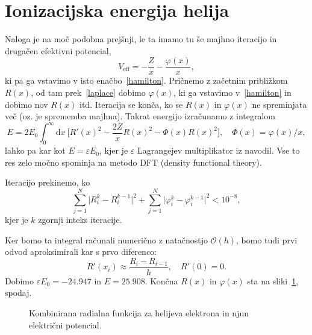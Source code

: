 \documentclass[a4 paper, 12pt]{article}
\renewcommand{\d}{
	\ensuremath{\mathrm{d}}
}
\begin{document}
\section{Ionizacijska energija helija}

Naloga je na mo\v c podobna prej\v snji, le ta imamo tu \v se majhno iteracijo in druga\v cen efektivni potencial,
\[
	V_\text{eff} = -\frac{Z}{x} -\frac{\varphi(x)}{x},
\]
ki pa ga vstavimo v isto ena\v cbo~\eqref{hamilton}. Pri\v cnemo z za\v cetnim pribli\v zkom $R(x)$, od tam
prek~\eqref{laplace} dobimo $\varphi(x)$, ki ga vstavimo v~\eqref{hamilton} in dobimo nov $R(x)$ itd. Iteracija
se kon\v ca, ko se $R(x)$ in $\varphi(x)$ ne spreminjata ve\v c (oz. je sprememba majhna). Takrat energijo
izra\v cunamo z integralom
\[
	E = 2E_0 \int_0^\infty \d x\ \bigg[R'(x)^2 - \frac{2Z}{x}R(x)^2 - \Phi(x)R(x)^2\bigg],\quad
		\Phi(x) = \varphi(x)/x,
\]
lahko pa kar kot $E = \varepsilon E_0$, kjer je $\varepsilon$ Lagrangejev multiplikator iz navodil.
Vse to res zelo mo\v cno spominja na metodo DFT (density functional theory).

Iteracijo prekinemo, ko
\[
	\sum_{j = 1}^N \big|R_i^k - R_i^{k-1}\big|^2 + \sum_{j = 1}^N \big|\varphi_i^k - \varphi_i^{k-1}\big|^2 < 10^{-8},
\]
kjer je $k$ zgornji inteks iteracije.

Ker bomo ta integral ra\v cunali numeri\v cno z nata\v cnostjo $\mathcal{O}(h)$, bomo tudi prvi odvod aproksimirali
kar s prvo diferenco:
\[
	R'(x_i) \approx \frac{R_i - R_{i-1}}{h}, \quad R'(0) = 0.
\]
Dobimo $\varepsilon E_0 = -24.947$ in $E = 25.908$. Kon\v cna $R(x)$ in $\varphi(x)$ sta na sliki~\ref{gr3}, spodaj.
\begin{figure}[H]\centering
	
	\caption{Kombinirana radialna funkcija za helijeva elektrona in njun elektri\v cni potencial.}
	\label{gr3}
\end{figure}
\end{document}
